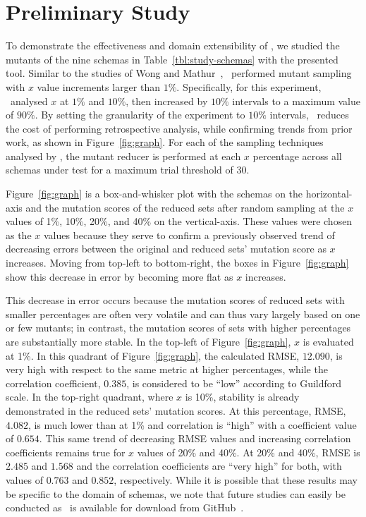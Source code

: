 \vspace*{-.25em}

\section{Preliminary Study}


To demonstrate the effectiveness and domain extensibility of \mrstudyr, we studied the mutants of the nine schemas in
Table~\ref{tbl:study-schemas} with the presented tool. Similar to the studies of Wong and Mathur~\cite{mathur1994empirical},
\mr~performed mutant sampling with $x$ value increments larger than $1\%$. Specifically, for this experiment, \mr~analysed
$x$ at $1\%$ and $10\%$, then increased by $10\%$ intervals to a maximum value of $90\%$. By setting the granularity of the
experiment to $10\%$ intervals, \mr~reduces the cost of performing retrospective analysis, while confirming trends from prior
work, as shown in Figure~\ref{fig:graph}. For each of the sampling techniques analysed by \mr, the mutant reducer is performed
at each $x$ percentage across all schemas under test for a maximum trial threshold of 30.

Figure~\ref{fig:graph} is a box-and-whisker plot with the schemas on the horizontal-axis and the mutation scores of the reduced
sets after random sampling at the $x$ values of 1\%, 10\%, 20\%, and 40\% on the vertical-axis.  These values were chosen as the
$x$ values because they serve to confirm a previously observed trend of decreasing errors between the original and reduced sets'
mutation score as $x$ increases. Moving from top-left to bottom-right, the boxes in Figure~\ref{fig:graph} show this decrease in
error by becoming more flat as $x$ increases.

This decrease in error occurs because the mutation scores of reduced sets with smaller percentages are often very volatile and can
thus vary largely based on one or few mutants; in contrast, the mutation scores of sets with higher percentages are substantially
more stable. In the top-left of Figure~\ref{fig:graph}, $x$ is evaluated at 1\%.  In this quadrant of Figure~\ref{fig:graph}, the
calculated RMSE, $12.090$, is very high with respect to the same metric at higher percentages, while the correlation coefficient,
$0.385$, is considered to be ``low'' according to Guildford scale. In the top-right quadrant, where
$x$ is 10\%, stability is already demonstrated in the reduced sets' mutation scores. At this percentage, RMSE, $4.082$, is much lower
than at 1\% and correlation is ``high'' with a coefficient value of $0.654$. This same trend of decreasing RMSE values and increasing
correlation coefficients remains true for $x$ values of 20\% and 40\%. At 20\% and 40\%, RMSE is $2.485$ and $1.568$ and the correlation
coefficients are ``very high'' for both, with values of $0.763$ and $0.852$, respectively. While it is possible that these results may
be specific to the domain of schemas, we note that future studies can easily be conducted as \mr~is available for download from
GitHub~\cite{tool}.


